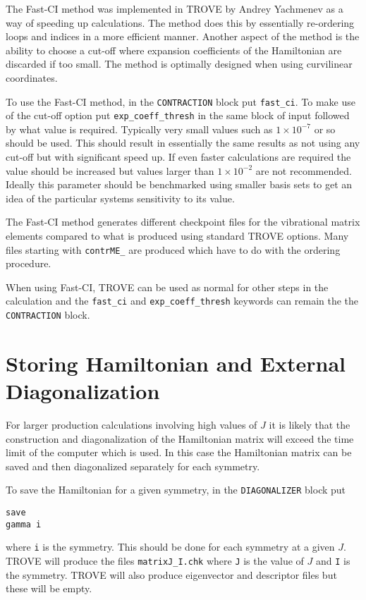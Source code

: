 The Fast-CI method was implemented in TROVE by Andrey Yachmenev as a way of speeding up calculations. The method does this by
essentially re-ordering loops and indices in a more efficient manner. Another aspect of the method is the ability to 
choose a cut-off where expansion coefficients of the Hamiltonian are discarded if too small. The method is optimally designed
when using curvilinear coordinates.

To use the Fast-CI method, in the \verb|CONTRACTION| block put \verb|fast_ci|. To make use of the cut-off option put
\verb|exp_coeff_thresh| in the same block of input followed by what value is required. Typically very small values such as
$1\times10^{-7}$ or so should be used. This should result in essentially the same results as not using any cut-off
but with significant speed up. If even faster calculations are required the value should be increased but values
larger than $1\times10^{-2}$ are not recommended. Ideally this parameter should be benchmarked using smaller basis sets
to get an idea of the particular systems sensitivity to its value. 

The Fast-CI method generates different checkpoint files for the vibrational matrix elements compared to what is produced
using standard TROVE options. Many files starting with \verb|contrME_| are produced which have to do with the ordering
procedure. 

When using Fast-CI, TROVE can be used as normal for other steps in the calculation and the \verb|fast_ci| and 
\verb|exp_coeff_thresh| keywords can remain the the \verb|CONTRACTION| block.
 




\section{Storing Hamiltonian and External Diagonalization} 

For larger production calculations involving high values of $J$ it is likely that the construction and diagonalization of
the Hamiltonian matrix will exceed the time limit of the computer which is used. In this case the Hamiltonian matrix can be
saved and then diagonalized separately for each symmetry.

To save the Hamiltonian for a given symmetry, in the \verb|DIAGONALIZER| block put
\begin{verbatim}
save
gamma i
\end{verbatim}
where \verb|i| is the symmetry. This should be done for each symmetry at a given $J$. TROVE will produce the files 
\verb|matrixJ_I.chk| where \verb|J| is the value of $J$ and \verb|I| is the symmetry. TROVE will also produce 
eigenvector and descriptor files but these will be empty.

